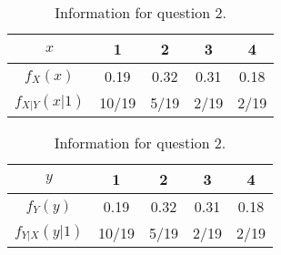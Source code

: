 \documentclass[10pt]{article}
\begin{document}
\begin{table}
    \centering
    \def\arraystretch{1.25}

    \begin{tabular}[b]{|c|cccc|} \hline
        \(x\) & 1 & 2 & 3 & 4 \\\hline
        \(f_X(x)\) & 0.19 & 0.32 & 0.31 & 0.18 \\
        \(f_{X|Y}(x|1)\) & 10/19 & 5/19 & 2/19 & 2/19 \\\hline
    \end{tabular}
    \quad
    \begin{tabular}[b]{|c|cccc|} \hline
        \(y\) & 1 & 2 & 3 & 4 \\\hline
        \(f_Y(y)\) & 0.19 & 0.32 & 0.31 & 0.18 \\
        \(f_{Y|X}(y|1)\) & 10/19 & 5/19 & 2/19 & 2/19 \\\hline
    \end{tabular}
    \caption{Information for question 2.}
    \label{q02-tab}
\end{table}

\end{document}
